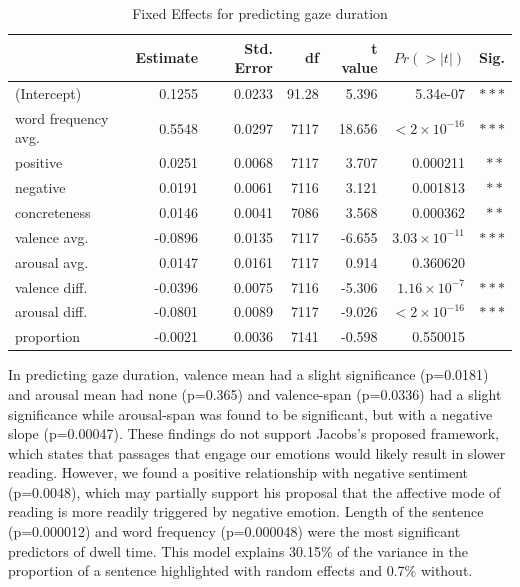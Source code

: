 \documentclass[11pt]{article}
\begin{document}
\begin{table}[t]
  \centering
  \begin{tabular}{|l|r|r|r|r|r|r|}
  \hline
  & Estimate & Std. Error & df & t value & $Pr(>|t|)$ & Sig. \\
  \hline
  (Intercept) & 0.1255 & 0.0233 & 91.28 & 5.396 & 5.34e-07 & $\ast\ast\ast$ \\
  word frequency avg. & 0.5548 & 0.0297 & 7117 & 18.656 & $< 2 \times 10^{-16}$ & $\ast\ast\ast$ \\
  positive & 0.0251 & 0.0068 & 7117 & 3.707 & 0.000211 & $\ast\ast$ \\
  negative & 0.0191 & 0.0061 & 7116 & 3.121 & 0.001813 & $\ast\ast$ \\
  concreteness & 0.0146 & 0.0041 & 7086 & 3.568 & 0.000362 & $\ast\ast$ \\
  valence avg. & -0.0896 & 0.0135 & 7117 & -6.655 & $3.03 \times 10^{-11}$ & $\ast\ast\ast$ \\
  arousal avg. & 0.0147 & 0.0161 & 7117 & 0.914 & 0.360620 & \\
  valence diff. & -0.0396 & 0.0075 & 7116 & -5.306 & $1.16 \times 10^{-7}$ & $\ast\ast\ast$ \\
  arousal diff. & -0.0801 & 0.0089 & 7117 & -9.026 & $< 2 \times 10^{-16}$ & $\ast\ast\ast$ \\
  proportion & -0.0021 & 0.0036 & 7141 & -0.598 & 0.550015 & \\
  \hline
  \end{tabular}
  \caption{Fixed Effects for predicting gaze duration}
  \label{tab:third}
  \end{table}

In predicting gaze duration, valence mean had a slight significance (p=0.0181) and arousal mean had none (p=0.365) and valence-span (p=0.0336) had a slight significance while arousal-span was found to be significant, but with a negative slope (p=0.00047). These findings do not support Jacobs's proposed framework, which states that passages that engage our emotions would likely result in slower reading. However, we found a positive relationship with negative sentiment (p=0.0048), which may partially support his proposal that the affective mode of reading is more readily triggered by negative emotion. Length of the sentence (p=0.000012) and word frequency (p=0.000048) were the most significant predictors of dwell time. This model explains 30.15\% of the variance in the proportion of a sentence highlighted with random effects and 0.7\% without.
\end{document}
